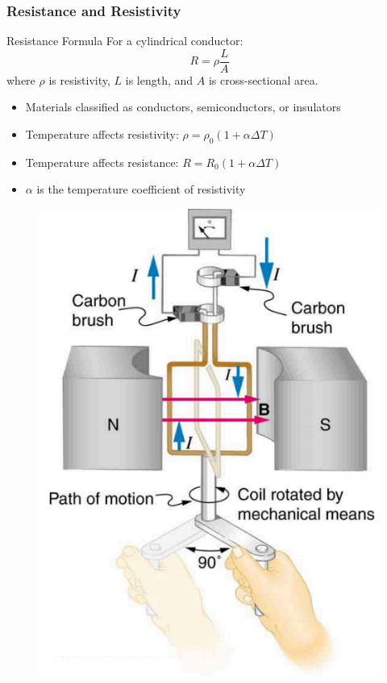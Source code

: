 \documentclass{beamer}
\begin{document}
\begin{frame}
    \frametitle{Resistance and Resistivity}
    \begin{block}{Resistance Formula}
        For a cylindrical conductor:
        \[ R = \rho\frac{L}{A} \]
        where $\rho$ is resistivity, $L$ is length, and $A$ is cross-sectional area.
    \end{block}
    \begin{itemize}
        \item Materials classified as conductors, semiconductors, or insulators
        \item Temperature affects resistivity: $\rho = \rho_0(1 + \alpha\Delta T)$
        \item Temperature affects resistance: $R = R_0(1 + \alpha\Delta T)$
        \item $\alpha$ is the temperature coefficient of resistivity
    \end{itemize}
\end{frame}
\begin{frame}{}
    \begin{figure}
        \centering
        \includegraphics[width=1\linewidth]{image.png}
    \end{figure}
\end{frame}
\end{document}
